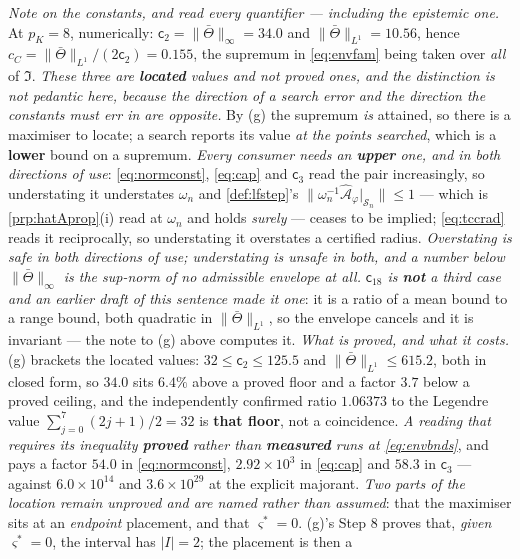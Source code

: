\noindent\emph{Note on the constants, and read every quantifier --- including the epistemic one.} At
$p_K=8$, numerically: $\mathsf c_2=\|\bar\Theta\|_\infty=34.0$ and $\|\bar\Theta\|_{L^{1}}=10.56$, hence
$c_C=\|\bar\Theta\|_{L^{1}}/(2\mathsf c_2)=0.155$, the supremum in \eqref{eq:envfam} being taken over
\emph{all} of $\mathfrak I$. \emph{These three are \textbf{located} values and not proved ones, and the
distinction is not pedantic here, because the direction of a search error and the direction the
constants must err in are opposite.} By \textup{(g)} the supremum \emph{is} attained, so there is a
maximiser to locate; a search reports its value \emph{at the points searched}, which is a \textbf{lower}
bound on a supremum. \emph{Every consumer needs an \textbf{upper} one, and in both directions of use}:
\eqref{eq:normconst}, \eqref{eq:cap} and $\mathsf c_3$ read the pair increasingly, so understating it
understates $\omega_n$ and \cref{def:lfstep}'s $\|\omega_n^{-1}\hat{\mathcal A}_\varphi
\vert_{\mathcal S_n}\|\le1$ --- which is \cref{prp:hatAprop}(i) read at $\omega_n$ and holds
\emph{surely} --- ceases to be implied; \eqref{eq:tccrad} reads it reciprocally, so understating it
overstates a certified radius. \emph{Overstating is safe in both directions of use; understating is
unsafe in both, and a number below $\|\bar\Theta\|_\infty$ is the sup-norm of no admissible envelope at
all.} \emph{$\mathsf c_{18}$ is \textbf{not} a third case and an earlier draft of this sentence made it
one}: it is a ratio of a mean bound to a range bound, both quadratic in $\|\bar\Theta\|_{L^{1}}$, so the
envelope cancels and it is invariant --- the note to \textup{(g)} above computes it.
\emph{What is proved, and what it costs.} \textup{(g)} brackets the located values:
$32\le\mathsf c_2\le125.5$ and $\|\bar\Theta\|_{L^{1}}\le615.2$, both in closed form, so $34.0$ sits
$6.4\%$ above a proved floor and a factor $3.7$ below a proved ceiling, and the independently confirmed
ratio $1.06373$ to the Legendre value $\sum_{j=0}^{7}(2j+1)/2=32$ is \textbf{that floor}, not a
coincidence. \emph{A reading that requires its inequality \textbf{proved} rather than \textbf{measured}
runs at \eqref{eq:envbnds}}, and pays a factor $54.0$ in \eqref{eq:normconst}, $2.92\times10^{3}$ in
\eqref{eq:cap} and $58.3$ in $\mathsf c_3$ --- against $6.0\times10^{14}$ and $3.6\times10^{29}$ at the
explicit majorant. \emph{Two parts of the location remain unproved and are named rather than assumed}:
that the maximiser sits at an \emph{endpoint} placement, and that $\varsigma^\ast=0$. \textup{(g)}'s
Step 8 proves that, \emph{given} $\varsigma^\ast=0$, the interval has $|I|=2$; the placement is then a
